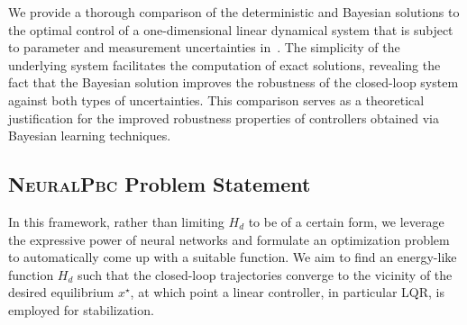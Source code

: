 \begin{rem}
    We provide a thorough comparison of the deterministic and Bayesian
    solutions to the optimal control of a one-dimensional linear dynamical
    system that is subject to parameter and measurement uncertainties
    in~\cite{ashenafi_robust_control_design}. 
    The simplicity of the underlying system facilitates the computation of
    exact solutions, revealing the fact that the Bayesian solution improves
    the robustness of the closed-loop system against both types of
    uncertainties.
    This comparison serves as a theoretical justification for the
    improved robustness properties of controllers obtained via Bayesian learning
    techniques.


\end{rem}


%


\subsection{\textsc{NeuralPbc} Problem Statement}
\label{ssec:ml-pbc}
In this framework, rather than limiting $H_d$ to be of a certain form, we
leverage the expressive power of neural networks and formulate an optimization
problem to automatically come up with a suitable function. 
%
We aim to find an energy-like function $H_d$ such that the closed-loop
trajectories converge to the vicinity of the desired equilibrium $x^\star$, at
which point a linear controller, in particular LQR, is employed for
stabilization.
%

